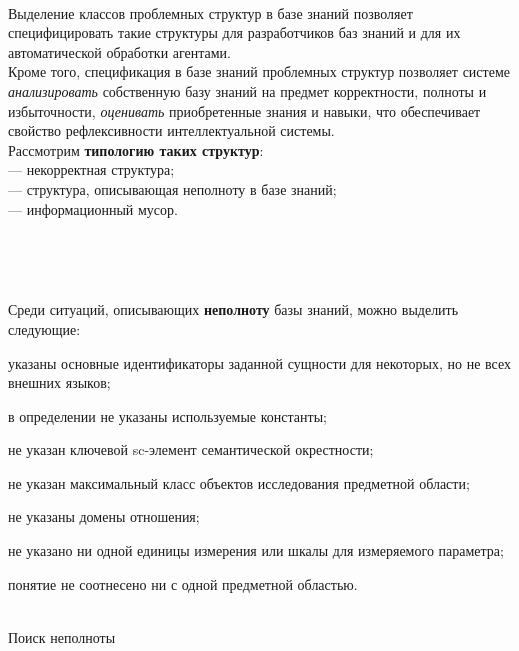 \begin{frame}{\\}
	\topline
	\justifying
	Выделение классов проблемных структур в базе знаний позволяет специфицировать такие структуры для разработчиков баз знаний и для их автоматической обработки агентами.\\
	Кроме того, спецификация в базе знаний проблемных структур позволяет системе \textit{анализировать} собственную базу знаний на предмет корректности, полноты и избыточности, \textit{оценивать} приобретенные знания и навыки, что обеспечивает свойство рефлексивности интеллектуальной системы.\\
	Рассмотрим \textbf{типологию таких структур}:\\
	--- некорректная структура;\\
	--- структура, описывающая неполноту в базе знаний;\\
	--- информационный мусор.\\
\end{frame}

\begin{frame}{\\}
	\topline
	\justifying
	\begin{SCn}
		
		
	\end{SCn}
\end{frame}

\begin{frame}{\\}
	\topline
	\justifying
	
	\vspace{10mm}
	Среди ситуаций, описывающих \textbf{неполноту} базы знаний, можно выделить следующие:
		\begin{textitemize}
			\item указаны основные идентификаторы заданной сущности для некоторых, но не всех внешних языков;
			\item в определении не указаны используемые константы;
			\item не указан ключевой sc-элемент семантической окрестности;
			\item не указан максимальный класс объектов исследования предметной области;
			\item не указаны домены отношения;
			\item не указано ни одной единицы измерения или шкалы для измеряемого	параметра;
			\item понятие не соотнесено ни с одной предметной областью.
		\end{textitemize}
\end{frame}

\begin{frame}{\\Поиск неполноты}%
	\topline
	\justifying
	\begin{SCn}
		
	\end{SCn}
\end{frame}